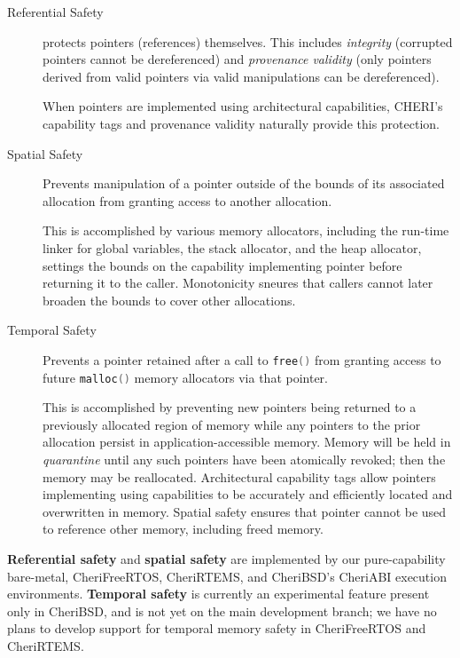 \documentclass[11pt]{article}
\newcommand{\ccode}[1]{\lstinline[language={C},basicstyle=\small\ttfamily]{#1}}
\newcommand{\cfunc}[1]{\ccode{#1()}}
\begin{document}
\begin{description}
\item[Referential Safety] protects pointers (references) themselves.
  This includes \textit{integrity} (corrupted pointers cannot be dereferenced)
  and \textit{provenance validity} (only pointers derived from valid pointers
  via valid manipulations can be dereferenced).

  When pointers are implemented using architectural capabilities, CHERI's
  capability tags and provenance validity naturally provide this protection.

\item[Spatial Safety] Prevents manipulation of a pointer outside of the bounds
  of its associated allocation from granting access to another allocation.

  This is accomplished by various memory allocators, including the run-time
  linker for global variables, the stack allocator, and the heap allocator,
  settings the bounds on the capability implementing pointer before returning
  it to the caller.
  Monotonicity sneures that callers cannot later broaden the bounds to cover
  other allocations.

\item[Temporal Safety] Prevents a pointer retained after a call to
  \cfunc{free} from granting access to future \cfunc{malloc} memory allocators
  via that pointer.

  This is accomplished by preventing new pointers being returned to a
  previously allocated region of memory while any pointers to the prior
  allocation persist in application-accessible memory.
  Memory will be held in \textit{quarantine} until any such pointers have been
  atomically revoked; then the memory may be reallocated.
  Architectural capability tags allow pointers implementing using capabilities
  to be accurately and efficiently located and overwritten in memory.
  Spatial safety ensures that pointer cannot be used to reference other
  memory, including freed memory.
\end{description}

\textbf{Referential safety} and \textbf{spatial safety} are implemented by our
pure-capability bare-metal, CheriFreeRTOS, CheriRTEMS, and CheriBSD's CheriABI
execution environments.
\textbf{Temporal safety} is currently an experimental feature present only in
CheriBSD, and is not yet on the main development branch; we have no plans to
develop support for temporal memory safety in CheriFreeRTOS and CheriRTEMS.
\end{document}
